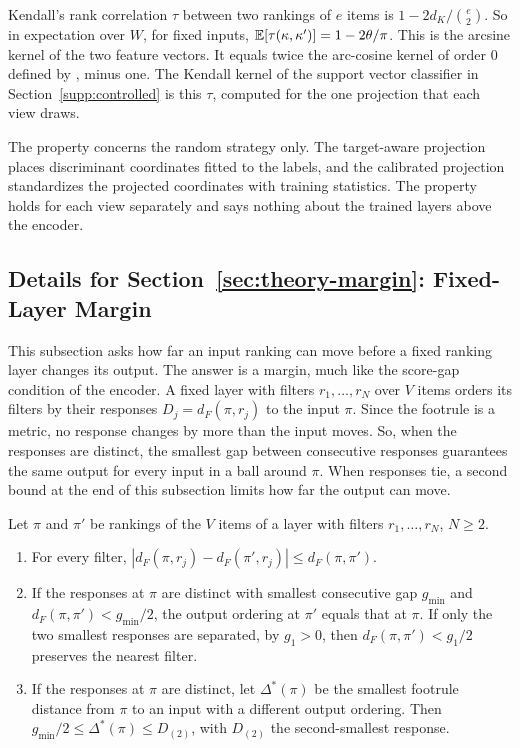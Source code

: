 

Kendall's rank correlation $\tau$ between two rankings of $e$ items is $1-2d_K/\binom{e}{2}$. So in expectation over $W$, for fixed inputs, $\mathbb{E}[\tau(\kappa,\kappa')]=1-2\theta/\pi$. This is the arcsine kernel of the two feature vectors. It equals twice the arc-cosine kernel of order 0 defined by \citet{cho2009kernel}, minus one. The Kendall kernel of the support vector classifier in Section~\ref{supp:controlled} is this $\tau$, computed for the one projection that each view draws.

The property concerns the random strategy only. The target-aware projection places discriminant coordinates fitted to the labels, and the calibrated projection standardizes the projected coordinates with training statistics. The property holds for each view separately and says nothing about the trained layers above the encoder.

\subsection{Details for Section~\ref*{sec:theory-margin}: Fixed-Layer Margin}\label{supp:margin}

This subsection asks how far an input ranking can move before a fixed ranking layer changes its output. The answer is a margin, much like the score-gap condition of the encoder. A fixed layer with filters $r_1,\dots,r_N$ over $V$ items orders its filters by their responses $D_j=d_F(\pi,r_j)$ to the input $\pi$. Since the footrule is a metric, no response changes by more than the input moves. So, when the responses are distinct, the smallest gap between consecutive responses guarantees the same output for every input in a ball around $\pi$. When responses tie, a second bound at the end of this subsection limits how far the output can move.

\begin{proposition}\label{prop:layer-margin}
Let $\pi$ and $\pi'$ be rankings of the $V$ items of a layer with filters $r_1,\dots,r_N$, $N\ge2$.
\begin{enumerate}[label=(\roman*),nosep]
\item For every filter, $|d_F(\pi,r_j)-d_F(\pi',r_j)|\le d_F(\pi,\pi')$.
\item If the responses at $\pi$ are distinct with smallest consecutive gap $g_{\min}$ and $d_F(\pi,\pi')<g_{\min}/2$, the output ordering at $\pi'$ equals that at $\pi$. If only the two smallest responses are separated, by $g_1>0$, then $d_F(\pi,\pi')<g_1/2$ preserves the nearest filter.
\item If the responses at $\pi$ are distinct, let $\Delta^*(\pi)$ be the smallest footrule distance from $\pi$ to an input with a different output ordering. Then $g_{\min}/2\le\Delta^*(\pi)\le D_{(2)}$, with $D_{(2)}$ the second-smallest response.
\end{enumerate}
\end{proposition}

